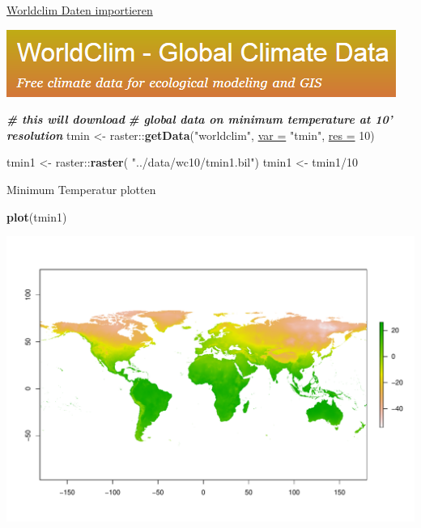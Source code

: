 \documentclass[ignorenonframetext,]{beamer}
\newenvironment{Shaded}{\begin{snugshade}}{\end{snugshade}}
\newcommand{\CommentTok}[1]{\textcolor[rgb]{0.00,0.40,1.00}{\textbf{\textit{#1}}}}
\newcommand{\DataTypeTok}[1]{\textcolor[rgb]{0.74,0.68,0.62}{\underline{#1}}}
\newcommand{\DecValTok}[1]{\textcolor[rgb]{0.27,0.67,0.26}{#1}}
\newcommand{\KeywordTok}[1]{\textcolor[rgb]{0.26,0.66,0.93}{\textbf{#1}}}
\newcommand{\NormalTok}[1]{\textcolor[rgb]{0.74,0.68,0.62}{#1}}
\newcommand{\OperatorTok}[1]{\textcolor[rgb]{0.74,0.68,0.62}{#1}}
\newcommand{\StringTok}[1]{\textcolor[rgb]{0.02,0.61,0.04}{#1}}
\begin{document}
\begin{frame}[fragile]{\href{https://pakillo.github.io/R-GIS-tutorial/\#raster}{Worldclim
Daten importieren}}
\protect\hypertarget{worldclim-daten-importieren}{}

\includegraphics{figure/WORLDCLIM.PNG}

\begin{Shaded}
\begin{Highlighting}[]
\CommentTok{# this will download }
\CommentTok{# global data on minimum temperature at 10' resolution}
\NormalTok{tmin <-}\StringTok{ }\NormalTok{raster}\OperatorTok{::}\KeywordTok{getData}\NormalTok{(}\StringTok{"worldclim"}\NormalTok{, }\DataTypeTok{var =} \StringTok{"tmin"}\NormalTok{, }\DataTypeTok{res =} \DecValTok{10}\NormalTok{)}
\end{Highlighting}
\end{Shaded}

\begin{Shaded}
\begin{Highlighting}[]
\NormalTok{tmin1 <-}\StringTok{ }\NormalTok{raster}\OperatorTok{::}\KeywordTok{raster}\NormalTok{( }\StringTok{"../data/wc10/tmin1.bil"}\NormalTok{)}
\NormalTok{tmin1 <-}\StringTok{ }\NormalTok{tmin1}\OperatorTok{/}\DecValTok{10}
\end{Highlighting}
\end{Shaded}

\end{frame}

\begin{frame}[fragile]{Minimum Temperatur plotten}
\protect\hypertarget{minimum-temperatur-plotten}{}

\begin{Shaded}
\begin{Highlighting}[]
\KeywordTok{plot}\NormalTok{(tmin1)}
\end{Highlighting}
\end{Shaded}

\includegraphics{A8_Rasterdaten_files/figure-beamer/unnamed-chunk-19-1.pdf}

\end{frame}
\end{document}
